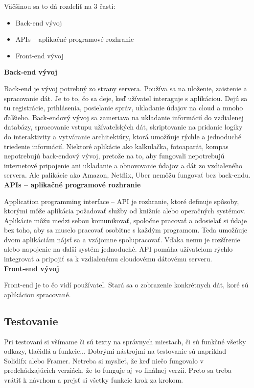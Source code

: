 \documentclass[10pt,twoside,slovak,a4paper]{article}
\begin{document}
Väčšinou sa to dá rozdeliť na 3 časti:
\begin{itemize}
\item Back-end vývoj
\item APIs – aplikačné programové rozhranie
\item Front-end vývoj
\end{itemize}



\textbf{Back-end vývoj}

\quad Back-end je vývoj potrebný zo strany servera. Používa sa na uloženie, zaistenie a spracovanie dát. Je to to, čo sa deje, keď užívateľ interaguje s aplikáciou. Dejú sa tu registrácie, prihlásenia, posielanie správ, ukladanie údajov na cloud a mnoho ďalšieho. Back-endový vývoj sa zameriava na ukladanie informácií do vzdialenej databázy, spracovanie vstupu užívateľských dát, skriptovanie na pridanie logiky do interaktivity a vytváranie architektúry, ktorá umožňuje rýchle a jednoduché triedenie informácií. Niektoré aplikácie ako kalkulačka, fotoaparát, kompas nepotrebujú back-endový vývoj, pretože na to, aby fungovali nepotrebujú internetové pripojenie ani ukladanie a obnovovanie údajov a dát zo vzdialeného servera. Ale palikácie ako Amazon, Netflix, Uber nemôžu fungovať bez back-endu.
\cite{openxcell, pixelfield}
\\	%


\textbf{APIs – aplikačné programové rozhranie}

\quad Application programming interface – API je rozhranie, ktoré definuje spôsoby, ktorými môže aplikácia požadovať služby od knižníc alebo operačných systémov. Aplikácie môžu medzi sebou komunikovať, spoločne pracovať a odosielať si údaje bez toho, aby sa muselo pracovať osobitne s každým programom. Teda umožňuje dvom aplikáciám nájsť sa a vzájomne spolupracovať. Vďaka nemu je rozšírenie alebo napojenie na ďalší systém jednoduché. API pomáha užívateľom rýchlo integrovať a pripojiť sa k vzdialenému cloudovému dátovému serveru. 
\cite{vivantina, wikigis}
\\	%


\textbf{Front-end vývoj}

\quad Front-end je to čo vidí používateľ. Stará sa o zobrazenie konkrétnych dát, koré sú aplikáciou spracované.

\cite{pixelfield}



\subsection{Testovanie}
\quad Pri testovaní si všímame či sú texty na správnych miestach, či sú funkčné všetky odkazy, tlačidlá a funkcie... Dobrými nástrojmi na testovanie sú napríklad Solidifx alebo Framer. Netreba si myslieť, že keď niečo fungovalo v predchádzajúcich verziách, že to funguje aj vo finálnej verzii. Preto sa treba vrátiť k návrhom a prejsť si všetky funkcie krok za krokom.
\end{document}
